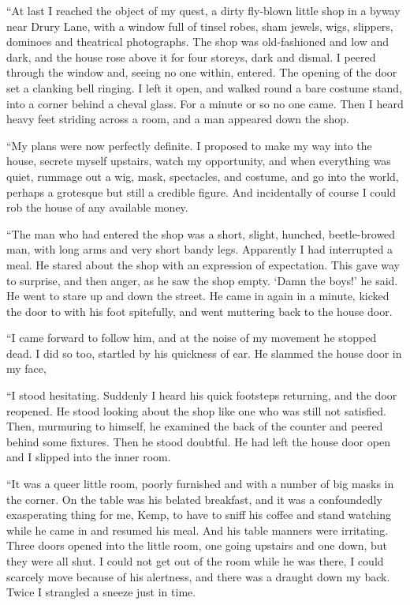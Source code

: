 “At last I reached the object of my quest, a dirty fly-blown little shop in a byway near Drury Lane, with a window full of tinsel robes, sham jewels, wigs, slippers, dominoes and theatrical photographs. The shop was old-fashioned and low and dark, and the house rose above it for four storeys, dark and dismal. I peered through the window and, seeing no one within, entered. The opening of the door set a clanking bell ringing. I left it open, and walked round a bare costume stand, into a corner behind a cheval glass. For a minute or so no one came. Then I heard heavy feet striding across a room, and a man appeared down the shop.

“My plans were now perfectly definite. I proposed to make my way into the house, secrete myself upstairs, watch my opportunity, and when everything was quiet, rummage out a wig, mask, spectacles, and costume, and go into the world, perhaps a grotesque but still a credible figure. And incidentally of course I could rob the house of any available money.

“The man who had entered the shop was a short, slight, hunched, beetle-browed man, with long arms and very short bandy legs. Apparently I had interrupted a meal. He stared about the shop with an expression of expectation. This gave way to surprise, and then anger, as he saw the shop empty. ‘Damn the boys!’ he said. He went to stare up and down the street. He came in again in a minute, kicked the door to with his foot spitefully, and went muttering back to the house door.

“I came forward to follow him, and at the noise of my movement he stopped dead. I did so too, startled by his quickness of ear. He slammed the house door in my face,

“I stood hesitating. Suddenly I heard his quick footsteps returning, and the door reopened. He stood looking about the shop like one who was still not satisfied. Then, murmuring to himself, he examined the back of the counter and peered behind some fixtures. Then he stood doubtful. He had left the house door open and I slipped into the inner room.

{“It was a queer little room, poorly furnished and with a number of big masks in the corner. On the table was his belated breakfast, and it was a confoundedly exasperating thing for me, Kemp, to have to sniff his coffee and stand watching while he came in and resumed his meal. And his table manners were irritating. Three doors opened into the little room, one going upstairs and one down, but they were all shut. I could not get out of the room while he was there, I could scarcely move because of his alertness, and there was a draught down my back. Twice I strangled a sneeze just in time.}

